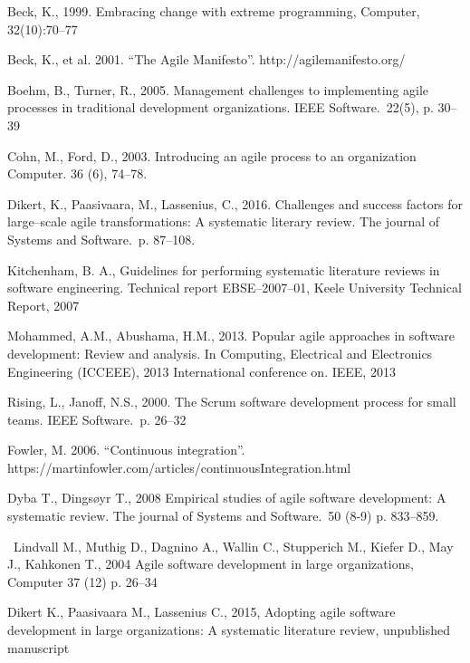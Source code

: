 \noindent [1] Beck, K., 1999. Embracing change with extreme programming, Computer,
32(10):70–77

\noindent [2] Beck, K., et al. 2001. ``The Agile Manifesto''.
http://agilemanifesto.org/

\noindent [3] Boehm, B., Turner, R., 2005. Management challenges to implementing agile
processes in traditional development organizations. IEEE Software.\ 22(5), p. 30–39

\noindent [4] Cohn, M., Ford, D., 2003. Introducing an agile process to an
organization Computer. 36 (6), 74–78.

\noindent [5] Dikert, K., Paasivaara, M., Lassenius, C., 2016. Challenges and success factors
for large–scale agile transformations: A systematic literary review. The journal
of Systems and Software.\ p. 87–108.

\noindent [6] Kitchenham, B. A., Guidelines for performing systematic literature
reviews in software engineering. Technical report EBSE–2007–01, Keele University
Technical Report, 2007

\noindent [7] Mohammed, A.M., Abushama, H.M., 2013. Popular agile approaches in software
development: Review and analysis. In Computing, Electrical and Electronics
Engineering (ICCEEE), 2013 International conference on. IEEE, 2013

\noindent [8] Rising, L., Janoff, N.S., 2000. The Scrum software development process for small teams. IEEE Software.\ p. 26–32

\noindent [9] Fowler, M. 2006. ``Continuous integration''.
https://martinfowler.com/articles/continuousIntegration.html

\noindent [10] Dyba T., Dingsøyr T., 2008 Empirical studies of agile
software development: A systematic review. The journal of Systems and
Software.\ 50 (8-9) p. 833–859.

\noindent [11] Lindvall M., Muthig D., Dagnino A., Wallin C.,
Stupperich M., Kiefer D., May J., Kahkonen T., 2004
Agile software development in large organizations, Computer 37 (12) p. 26–34

\noindent [12] Dikert K., Paasivaara M., Lassenius C., 2015, Adopting agile software development in large organizations: A systematic literature review, unpublished manuscript
